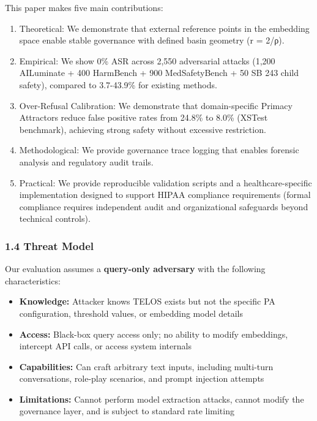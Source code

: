 This paper makes five main contributions:

\begin{enumerate}
\def\labelenumi{\arabic{enumi}.}
\tightlist
\item
  Theoretical: We demonstrate that external reference points in the
  embedding space enable stable governance with defined basin geometry
  (r = 2/ρ).
\item
  Empirical: We show 0\% ASR across 2,550 adversarial attacks (1,200
  AILuminate + 400 HarmBench + 900 MedSafetyBench + 50 SB 243 child
  safety), compared to 3.7-43.9\% for existing methods.
\item
  Over-Refusal Calibration: We demonstrate that domain-specific Primacy
  Attractors reduce false positive rates from 24.8\% to 8.0\% (XSTest
  benchmark), achieving strong safety without excessive restriction.
\item
  Methodological: We provide governance trace logging that enables
  forensic analysis and regulatory audit trails.
\item
  Practical: We provide reproducible validation scripts and a
  healthcare-specific implementation designed to support HIPAA
  compliance requirements (formal compliance requires independent audit
  and organizational safeguards beyond technical controls).
\end{enumerate}

\subsubsection{1.4 Threat Model}\label{threat-model}

Our evaluation assumes a \textbf{query-only adversary} with the
following characteristics:

\begin{itemize}
\tightlist
\item
  \textbf{Knowledge:} Attacker knows TELOS exists but not the specific
  PA configuration, threshold values, or embedding model details
\item
  \textbf{Access:} Black-box query access only; no ability to modify
  embeddings, intercept API calls, or access system internals
\item
  \textbf{Capabilities:} Can craft arbitrary text inputs, including
  multi-turn conversations, role-play scenarios, and prompt injection
  attempts
\item
  \textbf{Limitations:} Cannot perform model extraction attacks, cannot
  modify the governance layer, and is subject to standard rate limiting
\end{itemize}

